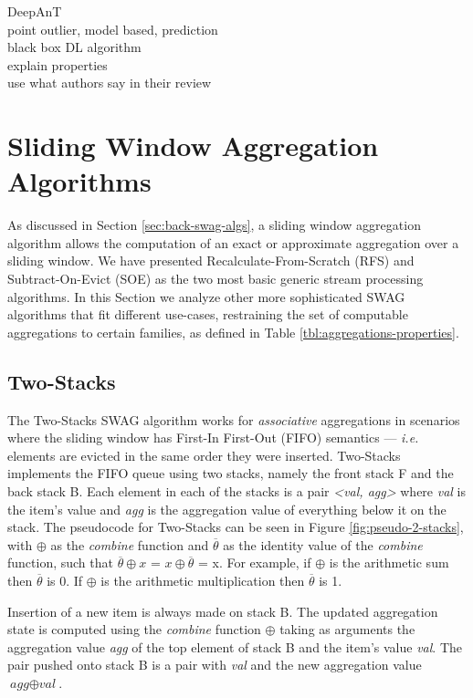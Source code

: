 DeepAnT\\
point outlier, model based, prediction\\
black box DL algorithm\\
explain properties\\
use what authors say in their review\\


\section{Sliding Window Aggregation Algorithms} \label{sec:sota-swag-algs}

As discussed in Section \ref{sec:back-swag-algs}, a sliding window aggregation algorithm allows the computation of an exact or approximate aggregation over a sliding window. We have presented Recalculate-From-Scratch (RFS) and Subtract-On-Evict (SOE) as the two most basic generic stream processing algorithms. In this Section we analyze other more sophisticated SWAG algorithms that fit different use-cases, restraining the set of computable aggregations to certain families, as defined in Table \ref{tbl:aggregations-properties}.

\subsection{Two-Stacks}
The Two-Stacks SWAG algorithm works for \textit{associative} aggregations in scenarios where the sliding window has First-In First-Out (FIFO) semantics --- \textit{i.e.} elements are evicted in the same order they were inserted. Two-Stacks \cite{Tangwongsan-DABA} implements the FIFO queue using two stacks, namely the front stack F and the back stack B. Each element in each of the stacks is a pair \textit{<val, agg>} where \textit{val} is the item's value and \textit{agg} is the aggregation value of everything below it on the stack. The pseudocode for Two-Stacks can be seen in Figure \ref{fig:pseudo-2-stacks}, with $\oplus$ as the \textit{combine} function and $\overline{\theta}$ as the identity value of the \textit{combine} function, such that $\overline{\theta} \oplus x$ = $x \oplus \overline{\theta}$ = x. For example, if $\oplus$ is the arithmetic sum then $\overline{\theta}$ is 0. If $\oplus$ is the arithmetic multiplication then $\overline{\theta}$ is 1.

Insertion of a new item is always made on stack B. The updated aggregation state is computed using the \textit{combine} function $\oplus$ taking as arguments the aggregation value \textit{agg} of the top element of stack B and the item's value \textit{val}. The pair pushed onto stack B is a pair with \textit{val} and the new aggregation value $\textit{agg} \oplus \textit{val}$.

